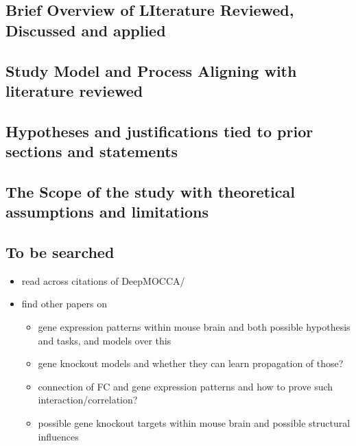 \documentclass[]{article}
\begin{document}
\subsection*{Brief Overview of LIterature Reviewed, Discussed and applied}

\subsection*{Study Model and Process Aligning with literature reviewed}

\subsection*{Hypotheses and justifications tied to prior sections and statements}

\subsection*{The Scope of the study with theoretical assumptions and limitations}

\subsection*{To be searched}
\begin{itemize}
	\item read across citations of DeepMOCCA/\citet{takata_flexible_2021}
	\item find other papers on
	\begin{itemize}
		\item gene expression patterns within mouse brain and both possible hypothesis and tasks, and models over this
		\item gene knockout models and whether they can learn propagation of those?
		\item connection of FC and gene expression patterns and how to prove such interaction/correlation?
		\item possible gene knockout targets within mouse brain and possible structural influences
	\end{itemize}
\end{itemize}
\end{document}
